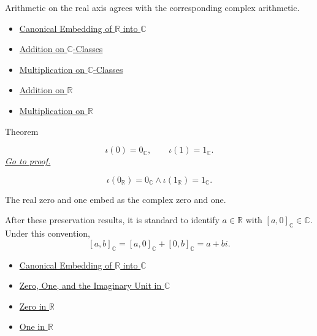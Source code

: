 \begin{remark*}[Interpretation]
Arithmetic on the real axis agrees with the corresponding complex arithmetic.
\end{remark*}

\begin{dependencies}
\begin{itemize}
  \item \hyperref[def:canonical-embedding-r-into-c]{Canonical Embedding of $\mathbb{R}$ into $\mathbb{C}$}
  \item \hyperref[def:addition-on-c-classes]{Addition on $\mathbb{C}$-Classes}
  \item \hyperref[def:multiplication-on-c-classes]{Multiplication on $\mathbb{C}$-Classes}
  \item \hyperref[def:addition-on-r]{Addition on $\mathbb{R}$}
  \item \hyperref[def:multiplication-on-r]{Multiplication on $\mathbb{R}$}
\end{itemize}
\end{dependencies}

\begin{theorembox}{Theorem}
\begin{theorem}
\label{thm:embedding-r-into-c-preserves-zero-one}
\[
\iota(0)=0_{\mathbb{C}},
\qquad
\iota(1)=1_{\mathbb{C}}.
\]
\hyperref[prf:embedding-r-into-c-preserves-zero-one]{\textit{Go to proof.}}
\end{theorem}
\end{theorembox}


\begin{remark*}
\[
\iota(0_{\mathbb{R}})=0_{\mathbb{C}}
\land
\iota(1_{\mathbb{R}})=1_{\mathbb{C}}.
\]
\end{remark*}

\begin{remark*}[Interpretation]
The real zero and one embed as the complex zero and one.


After these preservation results, it is standard to 
identify \(a\in\mathbb{R}\)
with \([a,0]_{\mathbb{C}}\in\mathbb{C}\). Under this convention,
\[
[a,b]_{\mathbb{C}}=[a,0]_{\mathbb{C}}+[0,b]_{\mathbb{C}}
=a+bi.
\]
\end{remark*}

\begin{dependencies}
\begin{itemize}
  \item \hyperref[def:canonical-embedding-r-into-c]{Canonical Embedding of $\mathbb{R}$ into $\mathbb{C}$}
  \item \hyperref[def:zero-one-i-in-c]{Zero, One, and the Imaginary Unit in $\mathbb{C}$}
  \item \hyperref[def:zero-in-r]{Zero in $\mathbb{R}$}
  \item \hyperref[def:one-in-r]{One in $\mathbb{R}$}
\end{itemize}
\end{dependencies}

